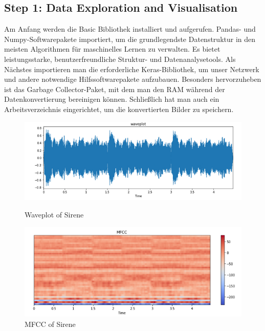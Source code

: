 \documentclass[a4paper,11pt]{article}
\theoremstyle{mytheor}
\begin{document}
\subsection{Step 1: Data Exploration and Visualisation}
Am Anfang werden die Basic Bibliothek installiert und aufgerufen.
Pandas- und Numpy-Softwarepakete importiert, um  die grundlegendste Datenstruktur in den meisten Algorithmen für maschinelles Lernen zu verwalten. Es bietet leistungsstarke, benutzerfreundliche Struktur- und Datenanalysetools. Als Nächstes importieren man die erforderliche Keras-Bibliothek, um unser Netzwerk und andere notwendige Hilfssoftwarepakete aufzubauen. Besonders hervorzuheben ist das Garbage Collector-Paket, mit dem man den RAM während der Datenkonvertierung bereinigen können. Schließlich hat man auch ein Arbeitsverzeichnis eingerichtet, um die konvertierten Bilder zu speichern. 
\begin{figure}[htbp]
\begin{minipage}[c]{0.5\textwidth}

\includegraphics[width=\textwidth]{waveplot.png}
	\caption {Waveplot of Sirene
 }
\end{minipage}
\hfill
\begin{minipage}[c]{0.5\textwidth}
\includegraphics[width=\textwidth]{MFCC.png}
	\caption {MFCC of Sirene}

\end{minipage}	
\end{figure}	
\end{document}
